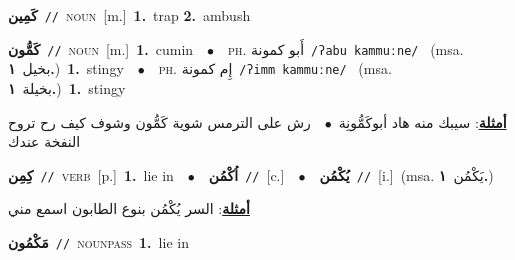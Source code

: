 \documentclass[10pt,a4paper,twoside]{article} %
\begin{document}
\begin{multicols}{2}
{\setlength\topsep{0pt}\textbf{\foreignlanguage{arabic}{كَمِين}}\ {\color{gray}\texttt{//}\color{black}}\ \textsc{noun}\ [m.]\ \textbf{1.}~trap  \textbf{2.}~ambush\ } \vspace{2mm}

{\setlength\topsep{0pt}\textbf{\foreignlanguage{arabic}{كَمُّون}}\ {\color{gray}\texttt{//}\color{black}}\ \textsc{noun}\ [m.]\ \textbf{1.}~cumin\ \ $\bullet$\ \ \textsc{ph.} \color{gray} \foreignlanguage{arabic}{أَبو كمونة}\color{black}\ {\color{gray}\texttt{/{\sffamily ʔabu kammuːne}/}\color{black}}\ \color{gray} (msa. \foreignlanguage{arabic}{بخيل}~\foreignlanguage{arabic}{\textbf{١.}})\color{black}\ \textbf{1.}~stingy\ \ $\bullet$\ \ \textsc{ph.} \color{gray} \foreignlanguage{arabic}{إِم كمونة}\color{black}\ {\color{gray}\texttt{/{\sffamily ʔimm kammuːne}/}\color{black}}\ \color{gray} (msa. \foreignlanguage{arabic}{بخيلة}~\foreignlanguage{arabic}{\textbf{١.}})\color{black}\ \textbf{1.}~stingy\  \begin{flushright}\color{gray}\foreignlanguage{arabic}{\textbf{\underline{\foreignlanguage{arabic}{أمثلة}}}: سيبك منه هاد أبوكَمُّونِة\ $\bullet$\ \  رش على الترمس شوية كَمُّون وشوف كيف رح تروح النفخة عندك}\end{flushright}\color{black}} \vspace{2mm}

{\setlength\topsep{0pt}\textbf{\foreignlanguage{arabic}{كِمِن}}\ {\color{gray}\texttt{//}\color{black}}\ \textsc{verb}\ [p.]\ \textbf{1.}~lie in\ \ $\bullet$\ \ \setlength\topsep{0pt}\textbf{\foreignlanguage{arabic}{اُكْمُن}}\ {\color{gray}\texttt{//}\color{black}}\ [c.]\ \ $\bullet$\ \ \setlength\topsep{0pt}\textbf{\foreignlanguage{arabic}{يُكْمُن}}\ {\color{gray}\texttt{//}\color{black}}\ [i.]\ \color{gray}(msa. \foreignlanguage{arabic}{يَكْمُن}~\foreignlanguage{arabic}{\textbf{١.}})\color{black}\  \begin{flushright}\color{gray}\foreignlanguage{arabic}{\textbf{\underline{\foreignlanguage{arabic}{أمثلة}}}: السر يُكْمُن بنوع الطابون اسمع مني}\end{flushright}\color{black}} \vspace{2mm}

{\setlength\topsep{0pt}\textbf{\foreignlanguage{arabic}{مَكْمُون}}\ {\color{gray}\texttt{//}\color{black}}\ \textsc{noun\textunderscore pass}\ \textbf{1.}~lie in\ } \vspace{2mm}


\end{multicols}
\end{document}

